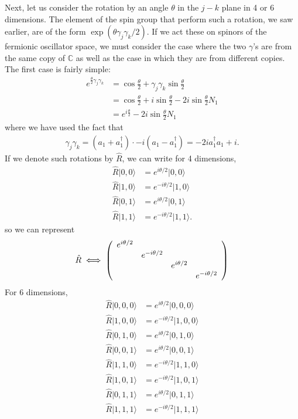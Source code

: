 \documentclass{../mathnotes}
\begin{document}
Next, let us consider the rotation by an angle $\theta$ in the $j-k$ plane in 4 or 6 dimensions. The element of the spin group that perform such a
rotation, we saw earlier, are of the form $\exp(\theta\gamma_j\gamma_k/2)$. If we act these on spinors of the fermionic oscillator space, we
must consider the case where the two $\gamma$'s are from the same copy of $\mathbb{C}$ as well as the case in which they are from different
copies. The first case is fairly simple:
\begin{align*}
    e^{\frac{\theta}{2}\gamma_j\gamma_k}&=\cos\frac{\theta}{2}+\gamma_j\gamma_k\sin\frac{\theta}{2}\\
    &=\cos\frac{\theta}{2}+i\sin\frac{\theta}{2}-2i\sin\frac{\theta}{2}N_1\\
    &=e^{i\frac{\theta}{2}}-2i\sin\frac{\theta}{2}N_1
\end{align*}
where we have used the fact that
\begin{align*}
    \gamma_j\gamma_k=(a_1+a_1^\dagger)\cdot -i(a_1-a_1^\dagger)=-2ia_1^\dagger a_1+i.
\end{align*}
If we denote such rotations by $\hat R$, we can write for 4 dimensions,
\begin{align*}
    \hat R|0,0\rangle&=e^{i\theta/2}|0,0\rangle\\
    \hat R|1,0\rangle&=e^{-i\theta/2}|1,0\rangle\\
    \hat R|0,1\rangle&=e^{i\theta/2}|0,1\rangle\\
    \hat R|1,1\rangle&=e^{-i\theta/2}|1,1\rangle.
\end{align*}
so we can represent
\begin{align*}
    \hat R \iff
    \left(
    \begin{array}[]{cccc}
        e^{i\theta/2} &  &  & \\
         & e^{-i\theta/2} &  & \\
         &  & e^{i\theta/2} & \\
         &  &  & e^{-i\theta/2}
    \end{array}
    \right)
\end{align*}
For 6 dimensions,
\begin{align*}
    \hat R|0,0,0\rangle&=e^{i\theta/2}|0,0,0\rangle\\
    \hat R|1,0,0\rangle&=e^{-i\theta/2}|1,0,0\rangle\\
    \hat R|0,1,0\rangle&=e^{i\theta/2}|0,1,0\rangle\\
    \hat R|0,0,1\rangle&=e^{i\theta/2}|0,0,1\rangle\\
    \hat R|1,1,0\rangle&=e^{-i\theta/2}|1,1,0\rangle\\
    \hat R|1,0,1\rangle&=e^{-i\theta/2}|1,0,1\rangle\\
    \hat R|0,1,1\rangle&=e^{i\theta/2}|0,1,1\rangle\\
    \hat R|1,1,1\rangle&=e^{-i\theta/2}|1,1,1\rangle\\
\end{align*}
\end{document}
